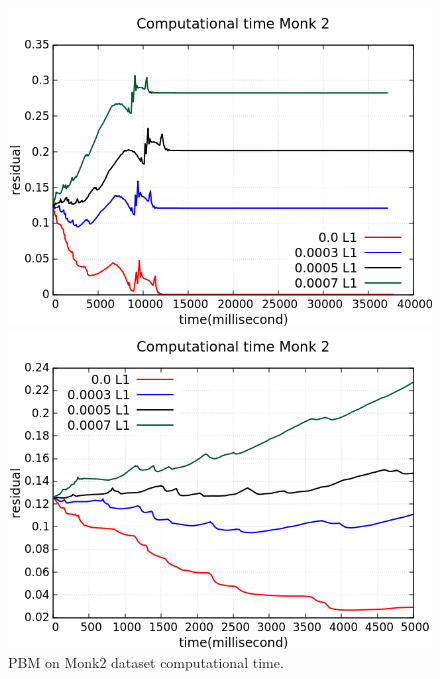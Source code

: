 \begin{figure}[H]
	\centering
	\begin{minipage}[t]{0.5\linewidth}
		\includegraphics[width=\linewidth]{data/PBM/Monk2/Monk2_PBM_L1_CT_standard.png}
	\end{minipage}%
	\begin{minipage}[t]{0.5\linewidth}
		\includegraphics[width=\linewidth]{data/PBM/Monk2/Monk2_PBM_L1_CT_zoom.png}
	\end{minipage}
	\caption{PBM on Monk2 dataset computational time.}
\end{figure}
